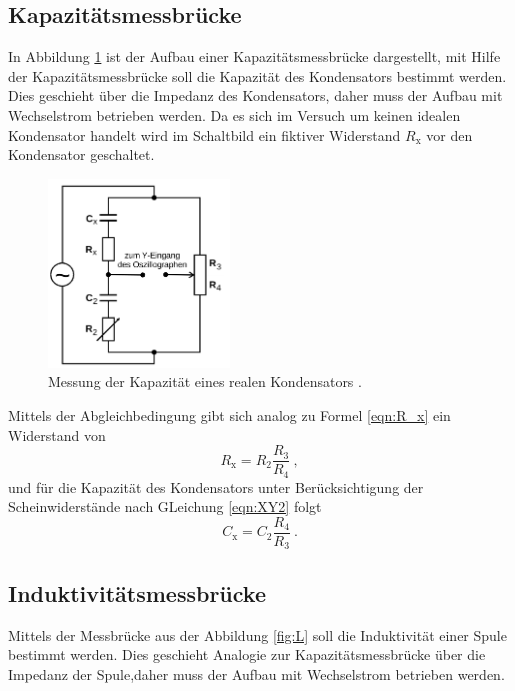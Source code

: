 \subsection{Kapazitätsmessbrücke}
In Abbildung \ref{fig:C} ist der Aufbau einer Kapazitätsmessbrücke dargestellt, mit Hilfe der Kapazitätsmessbrücke soll die Kapazität des Kondensators bestimmt werden. Dies geschieht über die Impedanz des Kondensators, daher muss der Aufbau mit Wechselstrom betrieben werden. Da es sich im Versuch um keinen idealen Kondensator handelt wird im Schaltbild ein fiktiver Widerstand $R_\text{x}$ vor den Kondensator geschaltet.
\begin{figure}[H]
  \centering
  \includegraphics[height=5cm]{picture/3.png}
  \caption{Messung der Kapazität eines realen Kondensators \cite{sample}.}
  \label{fig:C}
\end{figure}
Mittels der Abgleichbedingung gibt sich analog zu Formel \ref{eqn:R_x} ein Widerstand von
\begin{equation*}
    R_\text{x} = R_2 \frac{R_3}{R_4} \ ,
\end{equation*}
und für die Kapazität des Kondensators unter Berücksichtigung der Scheinwiderstände nach GLeichung \ref{eqn:XY2} folgt
\begin{equation}
  C_\text{x} = C_2 \frac{R_4}{R_3} \ .
  \label{eqn:C_x}
\end{equation}

\subsection{Induktivitätsmessbrücke}
Mittels der Messbrücke aus der Abbildung \ref{fig:L} soll die Induktivität einer Spule bestimmt werden. Dies geschieht Analogie zur Kapazitätsmessbrücke über die Impedanz der Spule,daher muss der Aufbau mit Wechselstrom betrieben werden.

